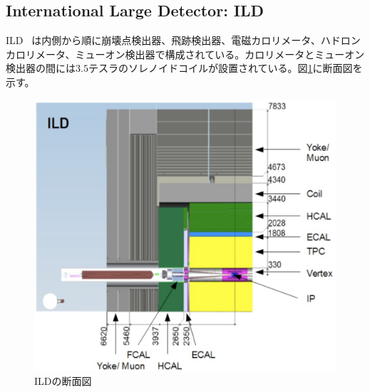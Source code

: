 \subsection{International Large Detector: ILD}
ILD ~\cite{tdr2}は内側から順に崩壊点検出器、飛跡検出器、電磁カロリメータ、ハドロンカロリメータ、ミューオン検出器で構成されている。カロリメータとミューオン検出器の間には$3.5$テスラのソレノイドコイルが設置されている。図\ref{ild}に断面図を示す。
\begin{figure}[H]
	\begin{center}
 \includegraphics[keepaspectratio, scale=0.25]
 	{Figure/Introduction/ild.png}
 		\caption {ILDの断面図}
 		\label{ild}
	\end{center}
\end{figure}

